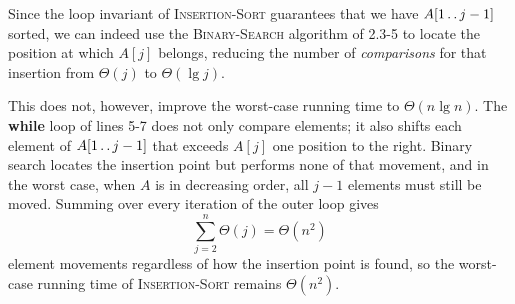 Since the loop invariant of \textsc{Insertion-Sort} guarantees that we have
$A[1 \mathinner{{\ldotp}\,{\ldotp}} j - 1]$ sorted, we can indeed use the \textsc{Binary-Search}
algorithm of 2.3-5 to locate the position at which $A[j]$ belongs, reducing the
number of \emph{comparisons} for that insertion from $\Theta(j)$ to
$\Theta(\lg{j})$.

This does not, however, improve the worst-case running time to
$\Theta(n\lg{n})$. The \textbf{while} loop of lines 5-7 does not only compare
elements; it also shifts each element of $A[1 \mathinner{{\ldotp}\,{\ldotp}} j-1]$ that exceeds
$A[j]$ one position to the right. Binary search locates the insertion point but
performs none of that movement, and in the worst case, when $A$ is in
decreasing order, all $j - 1$ elements must still be moved. Summing over every
iteration of the outer loop gives
\[
  \sum_{j = 2}^n \Theta(j) = \Theta(n^2)
\]
element movements regardless of how the insertion point is found, so the
worst-case running time of \textsc{Insertion-Sort} remains $\Theta(n^2)$.

